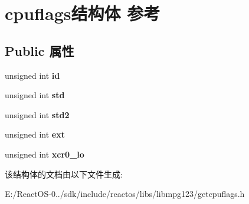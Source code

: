 \hypertarget{structcpuflags}{}\section{cpuflags结构体 参考}
\label{structcpuflags}
\subsection*{Public 属性}
\begin{DoxyCompactItemize}
\item 
\mbox{\label{structcpuflags_ab10bc6263566e4ab91287b496416ea74}} 
unsigned int {\bfseries id}
\item 
\mbox{\label{structcpuflags_a8350eb72facadae2cfe7cb755a6825e5}} 
unsigned int {\bfseries std}
\item 
\mbox{\label{structcpuflags_a0f8ca05851d79b982d2b7aed586e4505}} 
unsigned int {\bfseries std2}
\item 
\mbox{\label{structcpuflags_aa5dd9c9293028317419fa966755aac2f}} 
unsigned int {\bfseries ext}
\item 
\mbox{\label{structcpuflags_a8be86d51bf6d62d11bb80d794a09d51e}} 
unsigned int {\bfseries xcr0\+\_\+lo}
\end{DoxyCompactItemize}


该结构体的文档由以下文件生成\+:\begin{DoxyCompactItemize}
\item 
E\+:/\+React\+O\+S-\/0../sdk/include/reactos/libs/libmpg123/getcpuflags.\+h\end{DoxyCompactItemize}
